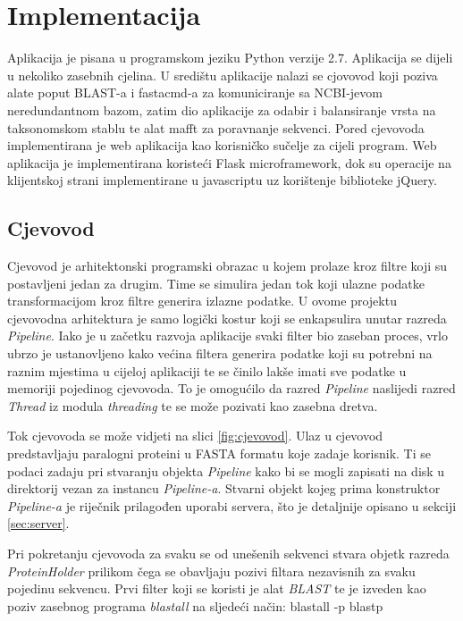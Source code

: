 \chapter{Implementacija}
\label{chap:implementacija}

Aplikacija je pisana u programskom jeziku Python verzije 2.7. Aplikacija se
dijeli u nekoliko zasebnih cjelina. U središtu aplikacije nalazi se cjovovod
koji poziva alate poput BLAST-a i fastacmd-a za komuniciranje sa NCBI-jevom
neredundantnom bazom, zatim dio aplikacije za odabir i balansiranje vrsta na
taksonomskom stablu te alat mafft za poravnanje sekvenci.  Pored cjevovoda
implementirana je web aplikacija kao korisničko sučelje za cijeli program. Web
aplikacija je implementirana koristeći Flask microframework, dok su operacije na
klijentskoj strani implementirane u javascriptu uz korištenje biblioteke jQuery.


\section{Cjevovod}
\label{sec:cjevovod}

Cjevovod je arhitektonski programski obrazac u kojem prolaze kroz filtre koji su
postavljeni jedan za drugim. Time se simulira jedan tok koji ulazne podatke
transformacijom kroz filtre generira izlazne podatke. U ovome projektu
cjevovodna arhitektura je samo logički kostur koji se enkapsulira unutar razreda
\emph{Pipeline}. Iako je u začetku razvoja aplikacije svaki filter bio zaseban
proces, vrlo ubrzo je ustanovljeno kako većina filtera generira podatke koji su
potrebni na raznim mjestima u cijeloj aplikaciji te se činilo lakše imati sve
podatke u memoriji pojedinog cjevovoda. To je omogućilo da razred
\emph{Pipeline} naslijedi razred \emph{Thread} iz modula \emph{threading} te se
može pozivati kao zasebna dretva.

Tok cjevovoda se može vidjeti na slici \ref{fig:cjevovod}. Ulaz u cjevovod
predstavljaju paralogni proteini u FASTA formatu koje zadaje korisnik. Ti se
podaci zadaju pri stvaranju objekta \emph{Pipeline} kako bi se mogli zapisati na
disk u direktorij vezan za instancu \emph{Pipeline-a}. Stvarni objekt kojeg
prima konstruktor \emph{Pipeline-a} je riječnik prilagođen uporabi servera, što
je detaljnije opisano u sekciji \ref{sec:server}.

Pri pokretanju cjevovoda za svaku se od unešenih sekvenci stvara objetk razreda
\emph{ProteinHolder} prilikom čega se obavljaju pozivi filtara nezavisnih za
svaku pojedinu sekvencu. Prvi filter koji se koristi je alat \emph{BLAST} te je
izveden kao poziv zasebnog programa \emph{blastall} na sljedeći način:
blastall -p blastp

